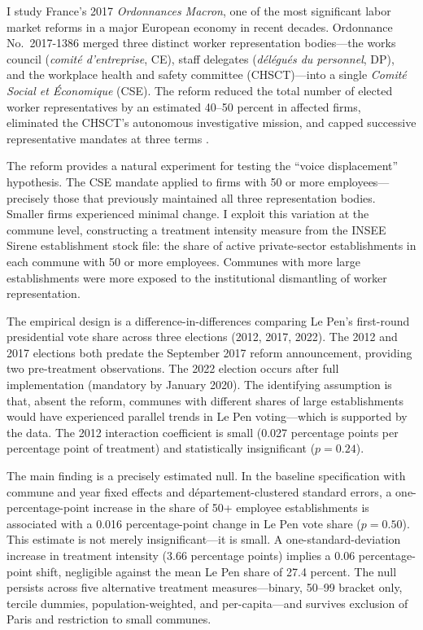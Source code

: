 \documentclass[12pt]{article}
\begin{document}
I study France's 2017 \textit{Ordonnances Macron}, one of the most significant labor market reforms in a major European economy in recent decades. Ordonnance No.\ 2017-1386 merged three distinct worker representation bodies---the works council (\textit{comit\'e d'entreprise}, CE), staff delegates (\textit{d\'el\'egu\'es du personnel}, DP), and the workplace health and safety committee (CHSCT)---into a single \textit{Comit\'e Social et \'Economique} (CSE). The reform reduced the total number of elected worker representatives by an estimated 40--50 percent in affected firms, eliminated the CHSCT's autonomous investigative mission, and capped successive representative mandates at three terms \citep{ferracci2014, aghion2022}.

The reform provides a natural experiment for testing the ``voice displacement'' hypothesis. The CSE mandate applied to firms with 50 or more employees---precisely those that previously maintained all three representation bodies. Smaller firms experienced minimal change. I exploit this variation at the commune level, constructing a treatment intensity measure from the INSEE Sirene establishment stock file: the share of active private-sector establishments in each commune with 50 or more employees. Communes with more large establishments were more exposed to the institutional dismantling of worker representation.

The empirical design is a difference-in-differences comparing Le Pen's first-round presidential vote share across three elections (2012, 2017, 2022). The 2012 and 2017 elections both predate the September 2017 reform announcement, providing two pre-treatment observations. The 2022 election occurs after full implementation (mandatory by January 2020). The identifying assumption is that, absent the reform, communes with different shares of large establishments would have experienced parallel trends in Le Pen voting---which is supported by the data. The 2012 interaction coefficient is small (0.027 percentage points per percentage point of treatment) and statistically insignificant ($p = 0.24$).

The main finding is a precisely estimated null. In the baseline specification with commune and year fixed effects and d\'epartement-clustered standard errors, a one-percentage-point increase in the share of 50+ employee establishments is associated with a 0.016 percentage-point change in Le Pen vote share ($p = 0.50$). This estimate is not merely insignificant---it is small. A one-standard-deviation increase in treatment intensity (3.66 percentage points) implies a 0.06 percentage-point shift, negligible against the mean Le Pen share of 27.4 percent. The null persists across five alternative treatment measures---binary, 50--99 bracket only, tercile dummies, population-weighted, and per-capita---and survives exclusion of Paris and restriction to small communes.
\end{document}
